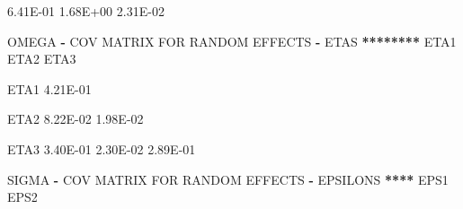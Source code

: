 \documentclass[
  11pt,
  krantz2, a4paper, twoside]{krantz}
\newenvironment{Shaded}{\begin{snugshade}}{\end{snugshade}}
\newcommand{\ErrorTok}[1]{\textcolor[rgb]{0.64,0.00,0.00}{\textbf{#1}}}
\newcommand{\FloatTok}[1]{\textcolor[rgb]{0.00,0.00,0.81}{#1}}
\newcommand{\NormalTok}[1]{#1}
\newcommand{\OperatorTok}[1]{\textcolor[rgb]{0.81,0.36,0.00}{\textbf{#1}}}
\newcommand{\StringTok}[1]{\textcolor[rgb]{0.31,0.60,0.02}{#1}}
\theoremstyle{definition}
\theoremstyle{definition}
\theoremstyle{definition}
\theoremstyle{remark}
\begin{document}
\begin{Shaded}
\begin{Highlighting}[]
        \FloatTok{6.41E{-}01}  \FloatTok{1.68E+00}  \FloatTok{2.31E{-}02}                                                                   
                                                                                                       
                                                                                                       
                                                                                                       
\NormalTok{OMEGA }\OperatorTok{{-}}\StringTok{ }\NormalTok{COV MATRIX FOR RANDOM EFFECTS }\OperatorTok{{-}}\StringTok{ }\NormalTok{ETAS  }\OperatorTok{**}\ErrorTok{******}\StringTok{                                                 }
\StringTok{                                                                                                       }
\StringTok{                                                                                                       }
\StringTok{        }\NormalTok{ETA1      ETA2      ETA3                                                                       }
                                                                                                       
\NormalTok{ETA1    }\FloatTok{4.21E{-}01}                                                                                       
                                                                                                       
\NormalTok{ETA2    }\FloatTok{8.22E{-}02}  \FloatTok{1.98E{-}02}                                                                             
                                                                                                       
\NormalTok{ETA3    }\FloatTok{3.40E{-}01}  \FloatTok{2.30E{-}02}  \FloatTok{2.89E{-}01}                                                                   
                                                                                                       
                                                                                                       
                                                                                                       
\NormalTok{SIGMA }\OperatorTok{{-}}\StringTok{ }\NormalTok{COV MATRIX FOR RANDOM EFFECTS }\OperatorTok{{-}}\StringTok{ }\NormalTok{EPSILONS  }\OperatorTok{**}\ErrorTok{**}\StringTok{                                                 }
\StringTok{                                                                                                       }
\StringTok{                                                                                                       }
\StringTok{        }\NormalTok{EPS1      EPS2                                                                                 }
                                                                                                       

\end{Highlighting}
\end{Shaded}
\end{document}
